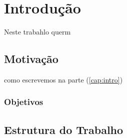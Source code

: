 

\chapter{Introdução}
Neste trabahlo querm

\label{cap:intro} %

\lipsum[1]

\section{Motivação}
\label{sec:motivacao}
como escrevemos na parte (\ref{cap:intro})
\lipsum[2-4]

\subsection{Objetivos}
\label{sec:objetivos}

\lipsum[2-5]

\section{Estrutura do Trabalho}
\label{sec:estrutura}

\lipsum[1]